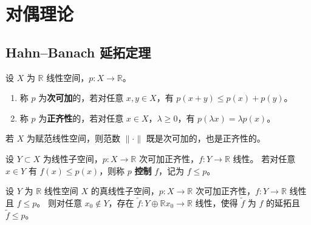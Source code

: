 \documentclass[lang=cn,a4paper,newtx,section]{elegantbook}
\begin{document}
\chapter{对偶理论}

\section{Hahn--Banach 延拓定理}

\begin{definition}[次可加与正齐性]
  设 $X$ 为 $\mathbb{R}$ 线性空间，$p:X\to\mathbb{R}$。
  \begin{enumerate}
    \item 称 $p$ 为\textbf{次可加}的，若对任意 $x,y\in X$，有 $p(x+y)\le p(x)+p(y)$。
    \item 称 $p$ 为\textbf{正齐性}的，若对任意 $x\in X$，$\lambda\ge 0$，有 $p(\lambda x)=\lambda p(x)$。
  \end{enumerate}
\end{definition}

\begin{example}
  若 $X$ 为赋范线性空间，则范数 $\|\cdot\|$ 既是次可加的，也是正齐性的。
\end{example}

\begin{definition}[控制]
  设 $Y\subset X$ 为线性子空间，$p:X\to\mathbb{R}$ 次可加正齐性，$f:Y\to\mathbb{R}$ 线性。
  若对任意 $x\in Y$ 有 $f(x)\le p(x)$，则称 $p$ \textbf{控制} $f$，记为 $f\le p$。
\end{definition}

\begin{lemma}[一维延拓引理]\label{lem:one-dim-extension}
  设 $Y$ 为 $\mathbb{R}$ 线性空间 $X$ 的真线性子空间，$p:X\to\mathbb{R}$ 次可加正齐性，$f:Y\to\mathbb{R}$ 线性且 $f\le p$。
  则对任意 $x_0\notin Y$，存在 $\tilde{f}:Y\oplus\mathbb{R}x_0\to\mathbb{R}$ 线性，使得 $\tilde{f}$ 为 $f$ 的延拓且 $\tilde{f}\le p$。
\end{lemma}
\end{document}
